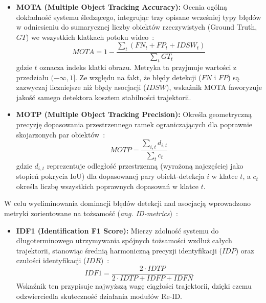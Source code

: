 \begin{itemize}
  \item \textbf{MOTA (Multiple Object Tracking Accuracy):} Ocenia ogólną dokładność systemu śledzącego, integrując trzy opisane wcześniej typy błędów w odniesieniu do sumarycznej liczby obiektów rzeczywistych (Ground Truth, $GT$) we wszystkich klatkach potoku wideo~\cite{bernardin2008, milan2016}:
        \begin{equation}
          MOTA = 1 - \frac{\sum_{t}(FN_{t} + FP_{t} + IDSW_{t})}{\sum_{t}GT_{t}}
        \end{equation}
        gdzie $t$ oznacza indeks klatki obrazu. Metryka ta przyjmuje wartości z przedziału $(-\infty, 1]$. Ze względu na fakt, że błędy detekcji ($FN$ i $FP$) są zazwyczaj liczniejsze niż błędy asocjacji ($IDSW$), wskaźnik MOTA faworyzuje jakość samego detektora kosztem stabilności trajektorii.

  \item \textbf{MOTP (Multiple Object Tracking Precision):} Określa geometryczną precyzję dopasowania przestrzennego ramek ograniczających dla poprawnie skojarzonych par obiektów~\cite{bernardin2008}:
        \begin{equation}
          MOTP = \frac{\sum_{i,t}d_{i,t}}{\sum_{t}c_{t}}
        \end{equation}
        gdzie $d_{i,t}$ reprezentuje odległość przestrzenną (wyrażoną najczęściej jako stopień pokrycia IoU) dla dopasowanej pary obiekt-detekcja $i$ w klatce $t$, a $c_t$ określa liczbę wszystkich poprawnych dopasowań w klatce $t$.
\end{itemize}

W celu wyeliminowania dominacji błędów detekcji nad asocjacją wprowadzono metryki zorientowane na
tożsamość (\textit{ang. ID-metrics})~\cite{ristani2016}:

\begin{itemize}
  \item \textbf{IDF1 (Identification F1 Score):} Mierzy zdolność systemu do długoterminowego utrzymywania spójnych tożsamości wzdłuż całych trajektorii, stanowiąc średnią harmoniczną precyzji identyfikacji ($IDP$) oraz czułości identyfikacji ($IDR$)~\cite{ristani2016}:
        \begin{equation}
          IDF1 = \frac{2\cdot{IDTP}}{2\cdot{IDTP} + IDFP + IDFN}
        \end{equation}
        Wskaźnik ten przypisuje najwyższą wagę ciągłości trajektorii, dzięki czemu  odzwierciedla skuteczność działania modułów Re-ID.
\end{itemize}

